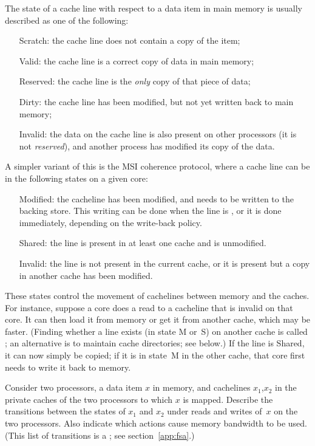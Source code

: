 The state of a cache line with respect to a data item in main memory
is usually described as one of the following:
\begin{itemize}
\item[Scratch:] the cache line does not contain a copy of the item;
\item[Valid:] the cache line is a correct copy of data in main memory;
\item[Reserved:] the cache line is the \emph{only} copy of that piece
  of data;
\item[Dirty:] the cache line has been modified, but not yet written
  back to main memory;
\item [Invalid:] the data on the cache line is also present on other
  processors (it is not \emph{reserved}), and another process has
  modified its copy of the data.
\end{itemize}

A simpler variant of this is the \acf{MSI} coherence protocol, where a
cache line can be in the following states on a given core:
\begin{itemize}
\item [Modified:] the cacheline has been modified, and needs to be
  written to the backing store. This writing can be done when the line
  is , or it is done immediately, depending on the
  write-back policy.
\item [Shared:] the line is present in at least one cache and is unmodified.
\item [Invalid:] the line is not present in the current cache, or it
  is present but a copy in another cache has been modified.
\end{itemize}

These states control the movement of cachelines between memory and the
caches. For instance, suppose a core does a read to a cacheline that
is invalid on that core. It can then load it from memory or get it
from another cache, which may be faster. (Finding whether a line exists
(in state M or~S) on another cache is called ; an alternative
is to maintain cache directories; see below.) If
the line is Shared, it can now simply be copied; if it is in state~M in
the other cache, that core first needs to write it back to memory.

\begin{exercise}
  Consider two processors, a data item $x$ in memory, and cachelines
  $x_1$,$x_2$ in the private caches of the two processors to which $x$
  is mapped. Describe the transitions between the states of $x_1$ and
  $x_2$ under reads and writes of~$x$ on the two processors. Also
  indicate which actions cause memory bandwidth to be used. (This list
  of transitions is a ; see section~\ref{app:fsa}.)
\end{exercise}


